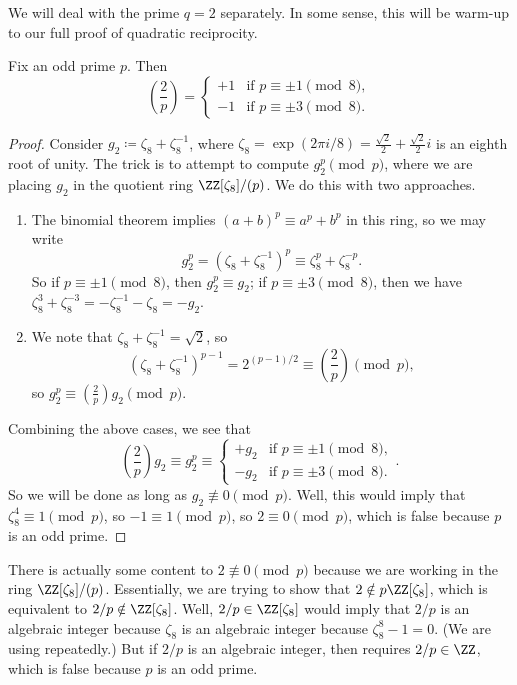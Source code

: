 \documentclass[../notes.tex]{subfiles}
\begin{document}
We will deal with the prime $q=2$ separately. In some sense, this will be warm-up to our full proof of quadratic reciprocity.
\begin{proposition} \label{prop:qr-second-supplement}
	Fix an odd prime $p$. Then
	\[\left(\frac2p\right)=\begin{cases}
		+1 & \text{if }p\equiv\pm1\pmod8, \\
		-1 & \text{if }p\equiv\pm3\pmod8.
	\end{cases}\]
\end{proposition}
\begin{proof}
	Consider $g_2\coloneqq\zeta_8+\zeta_8^{-1}$, where $\zeta_8=\exp(2\pi i/8)=\frac{\sqrt2}2+\frac{\sqrt2}2i$ is an eighth root of unity. The trick is to attempt to compute $g_2^p\pmod p$, where we are placing $g_2$ in the quotient ring $\ZZ[\zeta_8]/(p)$. We do this with two approaches.
	\begin{enumerate}
		\item The binomial theorem implies $(a+b)^p\equiv a^p+b^p$ in this ring, so we may write
		\[g_2^p=\left(\zeta_8+\zeta_8^{-1}\right)^p\equiv\zeta_8^p+\zeta_8^{-p}.\]
		So if $p\equiv\pm1\pmod8$, then $g_2^p\equiv g_2$; if $p\equiv\pm3\pmod8$, then we have $\zeta_8^3+\zeta_8^{-3}=-\zeta_8^{-1}-\zeta_8=-g_2$.
		\item We note that $\zeta_8+\zeta_8^{-1}=\sqrt2$, so
		\[\left(\zeta_8+\zeta_8^{-1}\right)^{p-1}=2^{(p-1)/2}\equiv\left(\frac2p\right)\pmod p,\]
		so $g_2^p\equiv\left(\frac2p\right)g_2\pmod p$.
	\end{enumerate}
	Combining the above cases, we see that
	\[\left(\frac2p\right)g_2\equiv g_2^p\equiv\begin{cases}
		+g_2 & \text{if }p\equiv\pm1\pmod8, \\
		-g_2 & \text{if }p\equiv\pm3\pmod8.
	\end{cases}.\]
	So we will be done as long as $g_2\not\equiv0\pmod p$. Well, this would imply that $\zeta_8^4\equiv1\pmod p$, so $-1\equiv1\pmod p$, so $2\equiv0\pmod p$, which is false because $p$ is an odd prime.
\end{proof}
\begin{remark} \label{rem:2-not-0-mod-p}
	There is actually some content to $2\not\equiv0\pmod p$ because we are working in the ring $\ZZ[\zeta_8]/(p)$. Essentially, we are trying to show that $2\notin p\ZZ[\zeta_8]$, which is equivalent to $2/p\notin\ZZ[\zeta_8]$. Well, $2/p\in\ZZ[\zeta_8]$ would imply that $2/p$ is an algebraic integer because $\zeta_8$ is an algebraic integer because $\zeta_8^8-1=0$. (We are using  repeatedly.) But if $2/p$ is an algebraic integer, then  requires $2/p\in\ZZ$, which is false because $p$ is an odd prime.
\end{remark}
\end{document}
